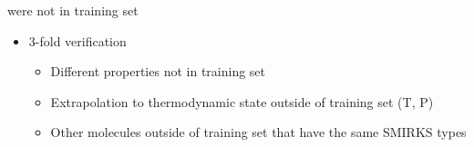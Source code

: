\documentclass[aps,pre,nofootinbib,superscriptaddress,linenumbers,10pt, draft,tightenlines]{revtex4-1}
\begin{document}
\begin{itemize}
\begin{itemize}
    	      were not in training set
    	\begin{itemize}
    		\item 3-fold verification
    		\begin{itemize}
    			\item Different properties not in training set
    			\item Extrapolation to thermodynamic state outside of training set (T, P)
    			\item Other molecules outside of training set that have the same SMIRKS types
    		\end{itemize}    		
    	\end{itemize} 
    \end{itemize}
\end{itemize}

 

\end{document}
